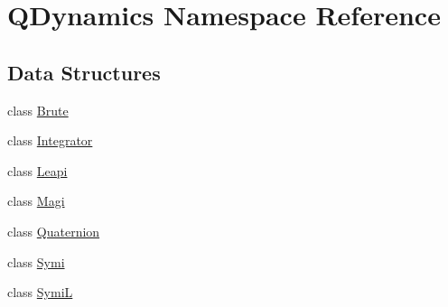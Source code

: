 \hypertarget{namespaceQDynamics}{}\section{Q\+Dynamics Namespace Reference}
\label{namespaceQDynamics}
\subsection*{Data Structures}
\begin{DoxyCompactItemize}
\item 
class \hyperlink{classQDynamics_1_1Brute}{Brute}
\item 
class \hyperlink{classQDynamics_1_1Integrator}{Integrator}
\item 
class \hyperlink{classQDynamics_1_1Leapi}{Leapi}
\item 
class \hyperlink{classQDynamics_1_1Magi}{Magi}
\item 
class \hyperlink{classQDynamics_1_1Quaternion}{Quaternion}
\item 
class \hyperlink{classQDynamics_1_1Symi}{Symi}
\item 
class \hyperlink{classQDynamics_1_1SymiL}{SymiL}
\end{DoxyCompactItemize}
